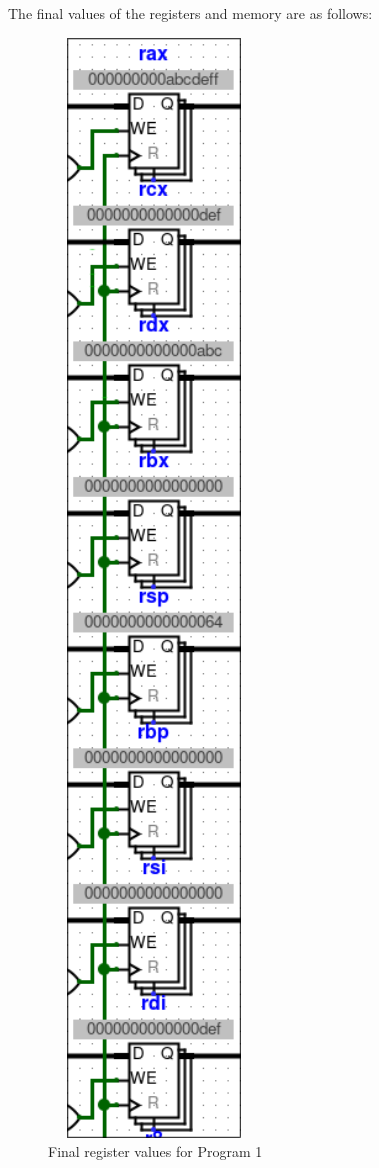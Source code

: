 \documentclass{article}
\begin{document}
The final values of the registers and memory are as follows:

\begin{minipage}{0.3\textwidth}
    \begin{figure}[H]
        \centering
        \includegraphics[width=0.5\textwidth]{./images/test1_reg1.png}
        \caption{Final register values for Program 1}
    \end{figure}
\end{minipage}
\end{document}
